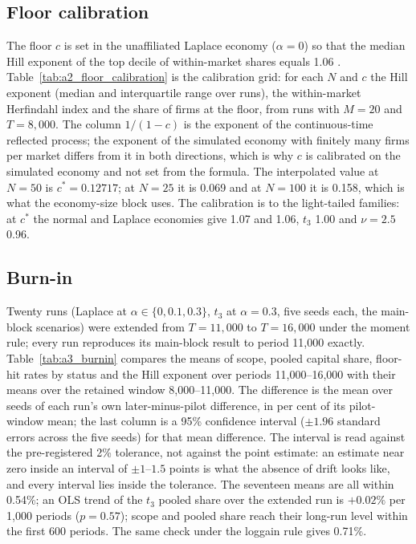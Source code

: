 


\subsection{Floor calibration}\label{app:floor}

The floor $c$ is set in the unaffiliated Laplace economy ($\alpha = 0$) so that the median Hill exponent of the top decile of within-market shares equals 1.06 \citep{axtell2001zipf}. Table~\ref{tab:a2_floor_calibration} is the calibration grid: for each $N$ and $c$ the Hill exponent (median and interquartile range over runs), the within-market Herfindahl index and the share of firms at the floor, from runs with $M = 20$ and $T = 8{,}000$. The column $1/(1-c)$ is the exponent of the continuous-time reflected process; the exponent of the simulated economy with finitely many firms per market differs from it in both directions, which is why $c$ is calibrated on the simulated economy and not set from the formula. The interpolated value at $N = 50$ is $c^* = 0.12717$; at $N = 25$ it is 0.069 and at $N = 100$ it is 0.158, which is what the economy-size block uses. The calibration is to the light-tailed families: at $c^*$ the normal and Laplace economies give 1.07 and 1.06, $t_3$ 1.00 and $\nu = 2.5$ 0.96.



\subsection{Burn-in}\label{app:burnin}

Twenty runs (Laplace at $\alpha \in \{0, 0.1, 0.3\}$, $t_3$ at $\alpha = 0.3$, five seeds each, the main-block scenarios) were extended from $T = 11{,}000$ to $T = 16{,}000$ under the moment rule; every run reproduces its main-block result to period 11,000 exactly. Table~\ref{tab:a3_burnin} compares the means of scope, pooled capital share, floor-hit rates by status and the Hill exponent over periods 11,000--16,000 with their means over the retained window 8,000--11,000. The difference is the mean over seeds of each run's own later-minus-pilot difference, in per cent of its pilot-window mean; the last column is a 95\% confidence interval ($\pm 1.96$ standard errors across the five seeds) for that mean difference. The interval is read against the pre-registered 2\% tolerance, not against the point estimate: an estimate near zero inside an interval of $\pm 1$--$1.5$ points is what the absence of drift looks like, and every interval lies inside the tolerance. The seventeen means are all within 0.54\%; an OLS trend of the $t_3$ pooled share over the extended run is $+0.02\%$ per 1,000 periods ($p = 0.57$); scope and pooled share reach their long-run level within the first 600 periods. The same check under the loggain rule gives 0.71\%.

